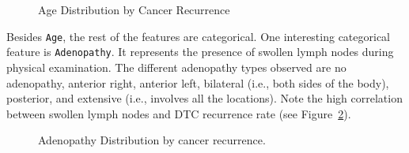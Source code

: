 \documentclass[
  letterpaper,
  DIV=11,
  numbers=noendperiod]{scrartcl}
\begin{document}
\label{cell-fig-age-dist}
\begin{figure}[H]


\caption{\label{fig-age-dist}Age Distribution by Cancer Recurrence}

\end{figure}%

Besides \texttt{Age}, the rest of the features are categorical. One
interesting categorical feature is \texttt{Adenopathy}. It represents
the presence of swollen lymph nodes during physical examination. The
different adenopathy types observed are no adenopathy, anterior right,
anterior left, bilateral (i.e., both sides of the body), posterior, and
extensive (i.e., involves all the locations). Note the high correlation
between swollen lymph nodes and DTC recurrence rate (see
Figure~\ref{fig-aden-dist}).

\label{cell-fig-aden-dist}
\begin{figure}[H]


\caption{\label{fig-aden-dist}Adenopathy Distribution by cancer
recurrence.}

\end{figure}%
\end{document}
